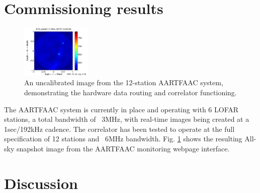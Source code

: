 \documentclass{ws-jai}
\begin{document}
\section {\label{sec:results} Commissioning results}
\begin{figure}[htbp]
   \includegraphics[width=0.3\textwidth]{Figs/A12_uncal.png}
\caption{An uncalibrated image from the 12-station AARTFAAC system, demonstrating the hardware data routing and  correlator functioning.}
\label{fig:afaac_results}
\end{figure}
The AARTFAAC system is currently in place and operating with 6 LOFAR stations, a
total bandwidth of  ~3MHz, with real-time images being created  at a 1sec/192kHz
cadence. The correlator has been tested  to operate at the full specification of
12  stations  and  ~6MHz  bandwidth.  Fig.   \ref{fig:afaac_results}  shows  the
resulting All-sky snapshot image from the AARTFAAC monitoring webpage interface.


\section {\label{sec:discussion} Discussion}
\end{document}
